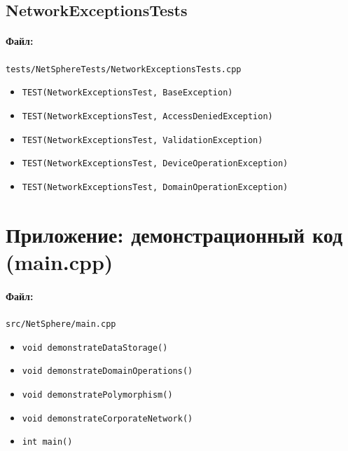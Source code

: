 \documentclass[14pt,a4paper]{extarticle}
\begin{document}
\subsection{NetworkExceptionsTests}
\paragraph{Файл:} \texttt{tests/NetSphereTests/NetworkExceptionsTests.cpp}
\begin{itemize}
  \item \texttt{TEST(NetworkExceptionsTest, BaseException)}
  \item \texttt{TEST(NetworkExceptionsTest, AccessDeniedException)}
  \item \texttt{TEST(NetworkExceptionsTest, ValidationException)}
  \item \texttt{TEST(NetworkExceptionsTest, DeviceOperationException)}
  \item \texttt{TEST(NetworkExceptionsTest, DomainOperationException)}
\end{itemize}

\section{Приложение: демонстрационный код (main.cpp)}
\paragraph{Файл:} \texttt{src/NetSphere/main.cpp}
\begin{itemize}
  \item \texttt{void demonstrateDataStorage()}
  \item \texttt{void demonstrateDomainOperations()}
  \item \texttt{void demonstratePolymorphism()}
  \item \texttt{void demonstrateCorporateNetwork()}
  \item \texttt{int main()}
\end{itemize}
\end{document}
